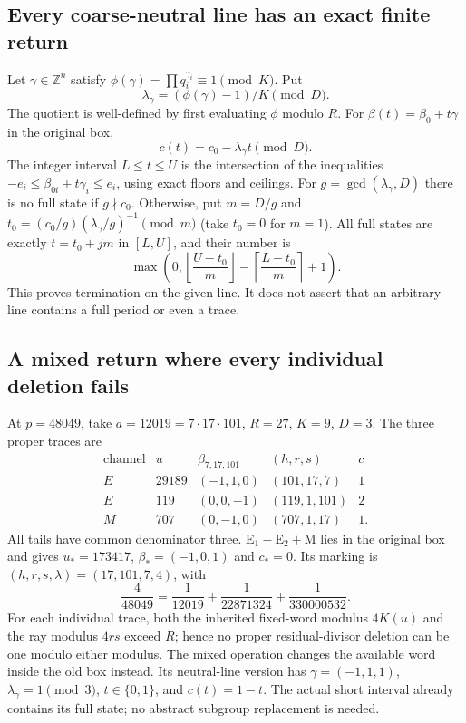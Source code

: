 \subsection{Every coarse-neutral line has an exact finite return}
Let $\gamma\in\mathbb Z^n$ satisfy
$\phi(\gamma)=\prod q_i^{\gamma_i}\equiv1\pmod K$. Put
\[
 \lambda_\gamma=(\phi(\gamma)-1)/K\pmod D.
\]
The quotient is well-defined by first evaluating $\phi$ modulo $R$.
For $\beta(t)=\beta_0+t\gamma$ in the original box,
\begin{equation}\label{eq:line}
 c(t)=c_0-\lambda_\gamma t\pmod D.
\end{equation}
The integer interval $L\le t\le U$ is the intersection of the inequalities
$-e_i\le\beta_{0i}+t\gamma_i\le e_i$, using exact floors and ceilings.
For $g=\gcd(\lambda_\gamma,D)$ there is no full state if $g\nmid c_0$.
Otherwise, put $m=D/g$ and
$t_0=(c_0/g)(\lambda_\gamma/g)^{-1}\pmod m$ (take $t_0=0$ for $m=1$).
All full states are exactly $t=t_0+jm$ in $[L,U]$, and their number is
\[
 \max\left(0,\left\lfloor\frac{U-t_0}{m}\right\rfloor
             -\left\lceil\frac{L-t_0}{m}\right\rceil+1\right).
\]
This proves termination on the given line. It does not assert that an arbitrary
line contains a full period or even a trace.

\subsection{A mixed return where every individual deletion fails}
At $p=48049$, take $a=12019=7\cdot17\cdot101$, $R=27$, $K=9$, $D=3$.
The three proper traces are
\[
\begin{array}{c|r|c|c|c}
\text{channel}&u&\beta_{7,17,101}&(h,r,s)&c\\\hline
E&29189&(-1,1,0)&(101,17,7)&1\\
E&119&(0,0,-1)&(119,1,101)&2\\
M&707&(0,-1,0)&(707,1,17)&1.
\end{array}
\]
All tails have common denominator three. E$_1-$E$_2+$M lies in the original
box and gives $u_*=173417$, $\beta_*=(-1,0,1)$ and $c_*=0$. Its marking is
$(h,r,s,\lambda)=(17,101,7,4)$, with
\begin{equation}\label{eq:48049}
 \frac4{48049}=\frac1{12019}+\frac1{22871324}+\frac1{330000532}.
\end{equation}
For each individual trace, both the inherited fixed-word modulus $4K(u)$
and the ray modulus $4rs$ exceed $R$; hence no proper residual-divisor deletion
can be one modulo either modulus. The mixed operation changes the available
word inside the old box instead.
Its neutral-line version has $\gamma=(-1,1,1)$, $\lambda_\gamma=1\pmod3$,
$t\in\{0,1\}$, and $c(t)=1-t$. The actual short interval already contains
its full state; no abstract subgroup replacement is needed.


